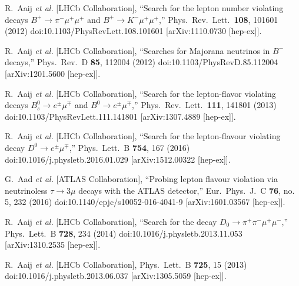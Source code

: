 \documentclass{PoS}
\begin{document}
\begin{thebibliography}{99}
  R.~Aaij {\it et al.} [LHCb Collaboration],
  ``Search for the lepton number violating decays $B^{+}\to \pi^- \mu^+ \mu^+$ and $B^{+}\to K^- \mu^+ \mu^+$,''
  Phys.\ Rev.\ Lett.\  {\bf 108}, 101601 (2012)
  doi:10.1103/PhysRevLett.108.101601
  [arXiv:1110.0730 [hep-ex]].

  R.~Aaij {\it et al.} [LHCb Collaboration],
  ``Searches for Majorana neutrinos in $B^-$ decays,''
  Phys.\ Rev.\ D {\bf 85}, 112004 (2012)
  doi:10.1103/PhysRevD.85.112004
  [arXiv:1201.5600 [hep-ex]].


  R.~Aaij {\it et al.} [LHCb Collaboration],
  ``Search for the lepton-flavor violating decays $B^0_s \rightarrow e^{\pm}\mu^{\mp}$ and $B^0 \rightarrow e^{\pm} \mu^{\mp}$,''
  Phys.\ Rev.\ Lett.\  {\bf 111}, 141801 (2013)
  doi:10.1103/PhysRevLett.111.141801
  [arXiv:1307.4889 [hep-ex]].

  R.~Aaij {\it et al.} [LHCb Collaboration],
  ``Search for the lepton-flavour violating decay $D^0 \to e^\pm\mu^\mp$,''
  Phys.\ Lett.\ B {\bf 754}, 167 (2016)
  doi:10.1016/j.physletb.2016.01.029
  [arXiv:1512.00322 [hep-ex]].

  G.~Aad {\it et al.} [ATLAS Collaboration],
  ``Probing lepton flavour violation via neutrinoless $\tau \longrightarrow 3\mu$ decays with the ATLAS detector,''
  Eur.\ Phys.\ J.\ C {\bf 76}, no. 5, 232 (2016)
  doi:10.1140/epjc/s10052-016-4041-9
  [arXiv:1601.03567 [hep-ex]].


  R.~Aaij {\it et al.} [LHCb Collaboration],
 ``Search for the decay $D_0 \to \pi^+ \pi^- \mu^+ \mu^-$,''
  Phys.\ Lett.\ B {\bf 728}, 234 (2014)
  doi:10.1016/j.physletb.2013.11.053
  [arXiv:1310.2535 [hep-ex]].

  R.~Aaij {\it et al.} [LHCb Collaboration],
  Phys.\ Lett.\ B {\bf 725}, 15 (2013)
  doi:10.1016/j.physletb.2013.06.037
  [arXiv:1305.5059 [hep-ex]].



\end{thebibliography}
\end{document}
